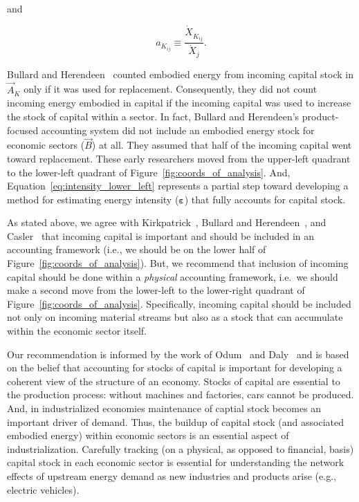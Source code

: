 \noindent{}and

\begin{equation}
	a_{\dot{K}_{ij}}
	\equiv
	\frac{\dot{X}_{\dot{K}_{ij}}}{\dot{X}_{j}}.
\end{equation}

Bullard and Herendeen~\cite{Bullard-III:1975aa}
counted embodied energy 
from incoming capital stock in $\vec{A}_{\dot{K}}$ 
only if it was used
for replacement.\cite[p.~488]{Bullard-III:1975aa}
Consequently, they did not count incoming energy embodied 
in capital if the incoming capital was used 
to increase the stock of capital within a sector.
In fact, Bullard and Herendeen's
product-focused accounting system
did not include an embodied energy stock 
for economic sectors ($\vec{B}$) at all.
They assumed that half of the incoming capital 
went toward replacement.
These early researchers moved from the upper-left quadrant
to the lower-left quadrant of Figure~\ref{fig:coords_of_analysis}.
And, Equation~\ref{eq:intensity_lower_left} represents 
a partial step toward developing 
a method for estimating energy intensity ($\boldsymbol{\varepsilon}$)
that fully accounts for capital stock.

As stated above, we agree with Kirkpatrick~\cite{Kirkpatrick:1974te}, 
Bullard and Herendeen~\cite{Bullard-III:1975aa},
and Casler~\cite{Casler:1983uy} that incoming capital
is important and should be included in an accounting framework
(i.e., we should be on the lower half of Figure~\ref{fig:coords_of_analysis}).
But, we recommend that inclusion of incoming capital should
be done within a \emph{physical} accounting framework, 
i.e.\ we should make a second move from the lower-left to the lower-right
quadrant of Figure~\ref{fig:coords_of_analysis}.
Specifically, incoming capital should be included 
not only on incoming material streams but also
as a stock that can accumulate within the economic sector itself.

Our recommendation is informed by the work of 
Odum~\cite{Odum1969} and Daly~\cite{Daly1995}
and is based on the belief that
accounting for stocks of capital is important for developing a coherent view
of the structure of an economy. 
Stocks of capital are essential to the production process:
without machines and factories, cars cannot be produced. 
And, in industrialized economies 
maintenance of captial stock becomes an important 
driver of demand.
Thus, the buildup of capital stock (and associated embodied energy) 
within economic sectors is an essential aspect of industrialization.
Carefully tracking (on a physical, as opposed to financial, basis) 
capital stock in each economic sector is essential 
for understanding the network effects of 
upstream energy demand as new industries and products arise 
(e.g., electric vehicles). 

